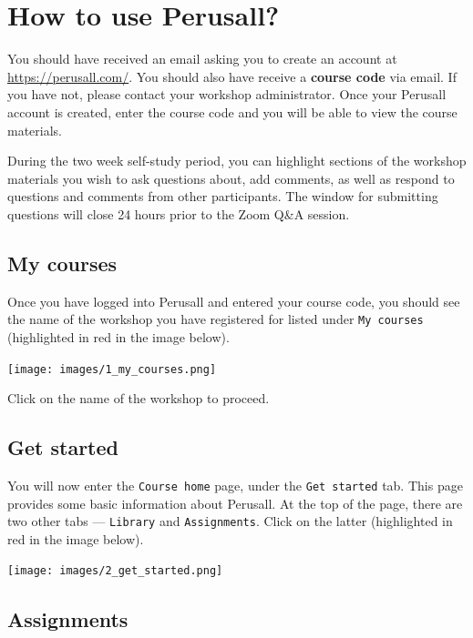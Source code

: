 \documentclass[]{book}
\begin{document}
\hypertarget{how-to-use-perusall}{%
\chapter*{How to use Perusall?}\label{how-to-use-perusall}}

You should have received an email asking you to create an account at \url{https://perusall.com/}. You should also have receive a \textbf{course code} via email. If you have not, please contact your workshop administrator. Once your Perusall account is created, enter the course code and you will be able to view the course materials.

During the two week self-study period, you can highlight sections of the workshop materials you wish to ask questions about, add comments, as well as respond to questions and comments from other participants. The window for submitting questions will close 24 hours prior to the Zoom Q\&A session.

\hypertarget{my-courses}{%
\section{My courses}\label{my-courses}}

Once you have logged into Perusall and entered your course code, you should see the name of the workshop you have registered for listed under \texttt{My\ courses} (highlighted in red in the image below).

\texttt{[image: images/1\_my\_courses.png]}

Click on the name of the workshop to proceed.

\hypertarget{get-started}{%
\section{Get started}\label{get-started}}

You will now enter the \texttt{Course\ home} page, under the \texttt{Get\ started} tab. This page provides some basic information about Perusall. At the top of the page, there are two other tabs --- \texttt{Library} and \texttt{Assignments}. Click on the latter (highlighted in red in the image below).

\texttt{[image: images/2\_get\_started.png]}

\hypertarget{assignments}{%
\section{Assignments}\label{assignments}}
\end{document}
